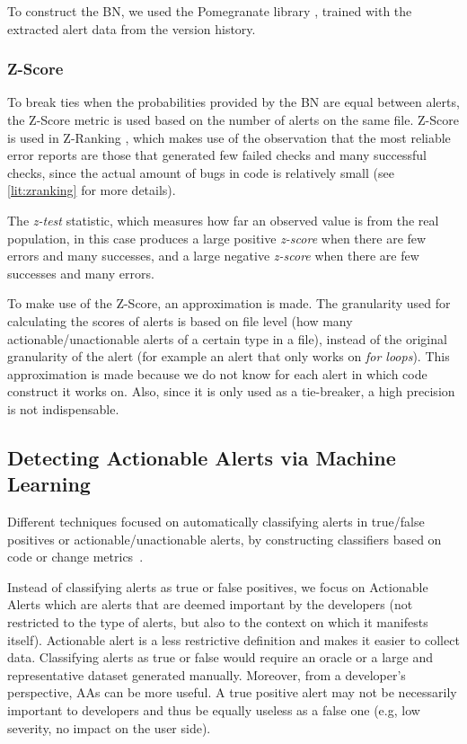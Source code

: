 To construct the BN, we used the Pomegranate library \cite{pomegranate}, trained with the extracted alert data from the version history. 

\subsubsection{Z-Score}

To break ties when the probabilities provided by the BN are equal between alerts, the Z-Score metric is used based on the number of alerts on the same file. Z-Score is used in Z-Ranking \cite{z-ranking}, which makes use of the observation that the most reliable error reports are those that generated few failed checks and many successful checks, since the actual amount of bugs in code is relatively small (see \cref{lit:zranking} for more details). 

The \textit{z-test} statistic, which measures how far an observed value is from the real population, in this case produces a large positive \textit{z-score} when there are few errors and many successes, and a large negative \textit{z-score} when there are few successes and many errors.

To make use of the Z-Score, an approximation is made. The granularity used for calculating the scores of alerts is based on file level (how many actionable/unactionable alerts of a certain type in a file), instead of the original granularity of the alert (for example an alert that only works on \textit{for loops}). This approximation is made because we do not know for each alert in which code construct it works on. Also, since it is only used as a tie-breaker, a high precision is not indispensable.

\subsection{Detecting Actionable Alerts via Machine Learning}

Different techniques focused on automatically classifying alerts in true/false positives or actionable/unactionable alerts, by constructing classifiers based on code or change metrics~\cite{actionable_sa, model_building_actionable}.

Instead of classifying alerts as true or false positives, we focus on Actionable Alerts which are alerts that are deemed important by the developers (not restricted to the type of alerts, but also to the context on which it manifests itself). Actionable alert is a less restrictive definition and makes it easier to collect data. Classifying alerts as true or false would require an oracle or a large and representative dataset generated manually. Moreover, from a developer's perspective, AAs can be more useful. A true positive alert may not be necessarily important to developers and thus be equally useless as a false one (e.g, low severity, no impact on the user side).

